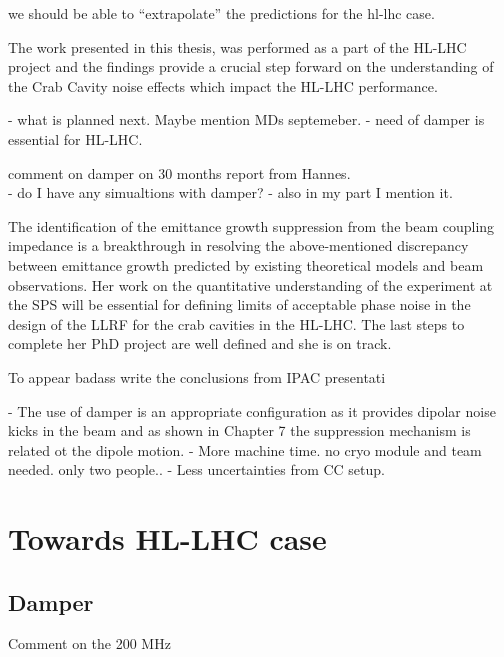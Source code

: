we should be able to “extrapolate” the predictions for  the hl-lhc case. 


The work presented in this thesis, was performed as a part of the HL-LHC project and the findings provide a crucial step forward on the understanding of the Crab Cavity noise effects which impact the HL-LHC performance. 


- what is planned next. Maybe mention MDs septemeber. 
- need of damper is essential for HL-LHC.

comment on damper on 30 months report from Hannes.\\
- do I have any simualtions with damper?
- also in my part I mention it.

The identification of the emittance growth suppression from the beam coupling impedance is a breakthrough in resolving the above-mentioned discrepancy between emittance growth predicted by existing theoretical models and beam observations. Her work on the quantitative understanding of the experiment at the SPS will be essential for defining limits of acceptable phase noise in the design of the LLRF for the crab cavities in the HL-LHC. The last steps to complete her PhD project are well defined and she is on track.








To appear badass write the conclusions from IPAC presentati


\newpage
- The use of damper is an appropriate configuration as it provides dipolar noise kicks in the beam and as shown in Chapter 7 the suppression mechanism is related ot the dipole motion. 
- More machine time. no cryo module and team needed. only two people..
- Less uncertainties from CC setup.




\section{Towards HL-LHC case}
\subsection{Damper}
Comment on the 200 MHz

